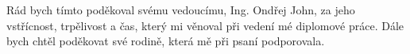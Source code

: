 \documentclass[czech,bachelor,unicode]{ctufit-thesis}
\theoremstyle{plain}
\theoremstyle{definition}
\theoremstyle{remark}
\numberwithin{theorem}{chapter}
\begin{document}
 
\frontmatter\frontmatterinit %


\thispagestyle{empty}\cleardoublepage\maketitle %

\imprintpage %

\tableofcontents %
\listoffigures %
\begingroup
\let\clearpage\relax
\listoftables %
\lstlistoflistings %
\endgroup

\begin{acknowledgmentpage}
	Rád bych tímto poděkoval svému vedoucímu, Ing. Ondřej John, za jeho vstřícnost, trpělivost a čas, který mi věnoval při vedení mé diplomové práce. Dále bych chtěl poděkovat své rodině, která mě při psaní podporovala.
\end{acknowledgmentpage} 
\end{document}
